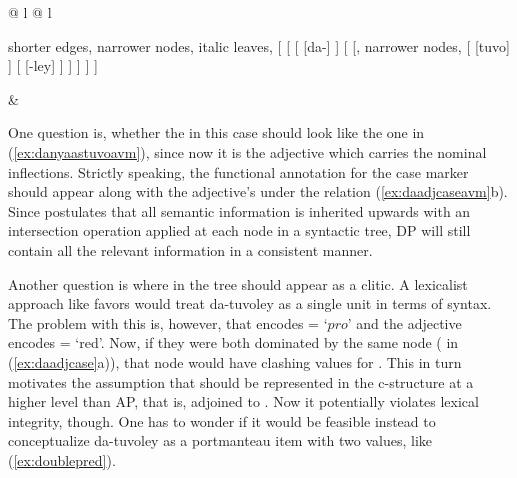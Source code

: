 \ex{}
\begin{tabular}[t]{@{} l @{\quad} l}
\tl\quad\label{ex:daadjcase}\ques%
\begin{forest} shorter edges, narrower nodes, italic leaves,
[{}
	[\anno{\xbar{D}}
		[\anno{Cl}
			[da-]
		]
		[{\anno[\pass{\Adjc}]{AP}}
				[, narrower nodes,
					[\anno{A\tsub{stem}}
						[tuvo]
					]
					[\anno{A\tsub{infl}}
						[-ley]
					]
				]
		]
	]
]
\end{forest}

&

\tl\quad\label{ex:daadjcaseavm} \ques{}
\end{tabular}
\xe

One question is, whether the \Avm{} in this case should look like the one in
(\ref{ex:danyaastuvoavm}), since now it is the adjective which carries the
nominal inflections. Strictly speaking, the functional annotation for the
case marker should appear along with the adjective's \Pred{} under the
\Adjc{} relation (\ref{ex:daadjcaseavm}b). Since \Lfg{} postulates that all
semantic information is inherited upwards with an intersection operation
applied at each node in a syntactic tree, DP will still contain all the
relevant information in a consistent manner.

Another question is where in the tree  should appear as a clitic.
A lexicalist approach like \Lfg{} favors would treat 
{da-tuvoley} as a single unit in terms of syntax. The problem with this is,
however, that  encodes \ups{\Pred} = `$pro$' and the adjective
encodes \ups{\Pred} = `red'. Now, if they were both dominated by the same node
( in (\ref{ex:daadjcase}a)), that node would have clashing values for
\Pred{}. This in turn motivates the assumption that  should be
represented in the c-structure at a higher level than AP, that is, adjoined to
. Now it potentially violates lexical integrity, though. One has to
wonder if it would be feasible instead to conceptualize 
{da-tuvoley} as a portmanteau item with two \Pred{} values, like
(\ref{ex:doublepred}).

